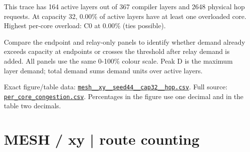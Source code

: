 \documentclass[10pt,a4paper]{article}
\begin{document}
This trace has 164 active layers out of 367 compiler layers and 2648 physical hop requests. At capacity 32, 0.00\% of active layers have at least one overloaded core. Highest per-core overload: C0 at 0.00\% (ties possible).\par
Compare the endpoint and relay-only panels to identify whether demand already exceeds capacity at endpoints or crosses the threshold after relay demand is added. All panels use the same 0-100\% colour scale. Peak D is the maximum layer demand; total demand sums demand units over active layers.\par
Exact figure/table data: \href{\detokenize{file:///home/dhruv-pansuriya/Documents/BTP/Compiler-Driven-ACE/output/pdf/qaoa_methods_congestion/tables/mesh__xy__seed44__cap32__hop.csv}}{\nolinkurl{mesh__xy__seed44__cap32__hop.csv}}. Full source: \href{\detokenize{file:///home/dhruv-pansuriya/Documents/BTP/Compiler-Driven-ACE/results/qaoa_2seed_2026-10-26/congestion/per_core_congestion.csv}}{\nolinkurl{per_core_congestion.csv}}. Percentages in the figure use one decimal and in the table two decimals.\par
\clearpage
\section*{MESH / xy | route counting}
\end{document}
